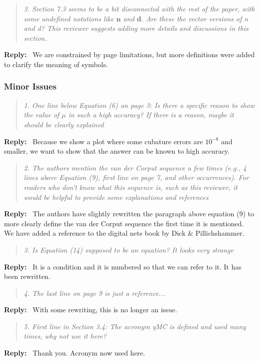 \documentclass[11pt]{article}
\newenvironment{response}{%
  \vspace{1em}
  \begin{quote}\itshape
}{%
  \end{quote}
  \noindent\textbf{Reply:}~
}
\begin{document}
\begin{response}{3.}
    Section 7.3 seems to be a bit disconnected with the rest of the paper, with some undefined notations like $\boldsymbol{n}$ and $\boldsymbol{d}$. Are these the vector versions of n and d? This reviewer suggests adding more details and discussions in this section.
\end{response}
We are constrained by page limitations, but more definitions were added to clarify the meaning of symbols.

\subsubsection*{Minor Issues}

\begin{response}{1.}
    One line below Equation (6) on page 3: Is there a specific reason to show the value of $\mu$ in such a high accuracy? If there is a reason, maybe it should be clearly explained
\end{response}
Because we show a plot where some cubature errors are $10^{-8}$ and smaller, we want to show that the answer can be known to high accuracy. 


\begin{response}{2.}
    The authors mention the van der Corput sequence a few times (e.g., 4 lines above Equation (9), first line on page 7, and other occurrences). For readers who don’t know what this sequence is, such as this reviewer, it would be helpful to provide some explanations and references
\end{response}
The authors have slightly rewritten the paragraph above equation (9) to more clearly define the van der Corput sequence the first time it is mentioned.  We have added a reference to the digital nets book by Dick \& Pillichshammer.


\begin{response}{3.}
    Is Equation (14) supposed to be an equation? It looks very strange
\end{response}
It is a condition and it is numbered so that we can refer to it.  It has been rewritten.


\begin{response}{4.}
    The last line on page 9 is just a reference...
\end{response}
With some rewriting, this is no longer an issue.

\begin{response}{5.}
    First line in Section 3.4: The acronym qMC is defined and used many times, why not use it here?
\end{response}
    Thank you. Acronym now used here.
\end{document}
